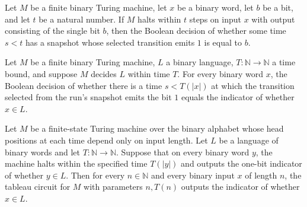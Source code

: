 \begin{theorem}
\label{Complexity.decide_emits_eq_of_computesInTime}
\leanok
{}
Let $M$ be a finite binary Turing machine, let $x$ be a binary word, let $b$ be a bit,
and let $t$ be a natural number. If $M$ halts within $t$ steps on input $x$ with output
consisting of the single bit $b$, then the Boolean decision of whether some time $s<t$
has a snapshot whose selected transition emits $1$ is equal to $b$.
\end{theorem}

\begin{theorem}
\label{Complexity.decide_emits_eq_indicator}
\leanok
{}
Let $M$ be a finite binary Turing machine, $L$ a binary language,
$T:\mathbb{N}\to\mathbb{N}$ a time bound, and suppose $M$ decides $L$ within time $T$.
For every binary word $x$, the Boolean decision of whether there is a time $s<T(|x|)$ at
which the transition selected from the run's snapshot emits the bit $1$ equals the
indicator of whether $x\in L$.
\end{theorem}

\begin{theorem}
\label{Complexity.tableauCircuit_eval_of_decidesInTime}
\leanok
{}
Let $M$ be a finite-state Turing machine over the binary alphabet whose head positions
at each time depend only on input length. Let $L$ be a language of binary words and let
$T:\mathbb{N}\to\mathbb{N}$. Suppose that on every binary word $y$, the machine halts
within the specified time $T(|y|)$ and outputs the one-bit indicator of whether $y\in
L$. Then for every $n\in\mathbb{N}$ and every binary input $x$ of length $n$, the
tableau circuit for $M$ with parameters $n,T(n)$ outputs the indicator of whether $x\in
L$.
\end{theorem}


